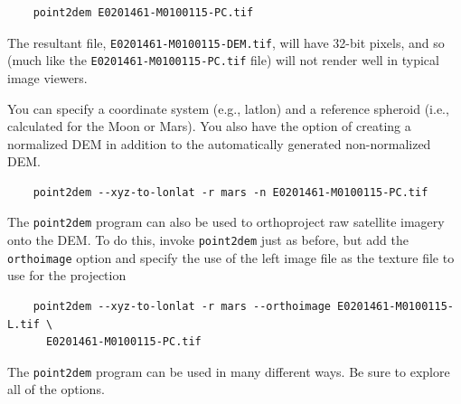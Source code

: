 \begin{verbatim}
    point2dem E0201461-M0100115-PC.tif
\end{verbatim}

The resultant file, \texttt{E0201461-M0100115-DEM.tif}, will have
32-bit pixels, and so (much like the \texttt{E0201461-M0100115-PC.tif}
file) will not render well in typical image viewers.

You can specify a coordinate system (e.g., latlon) and a reference
spheroid (i.e., calculated for the Moon or Mars). You also have the
option of creating a normalized DEM in addition to the automatically
generated non-normalized DEM.

\begin{verbatim}
    point2dem --xyz-to-lonlat -r mars -n E0201461-M0100115-PC.tif 
\end{verbatim}
\noindent
The \texttt{point2dem} program can also be used to orthoproject raw
satellite imagery onto the DEM. To do this, invoke \texttt{point2dem}
just as before, but add the \texttt{orthoimage} option and specify
the use of the left image file as the texture file to use for the
projection

\begin{verbatim}
    point2dem --xyz-to-lonlat -r mars --orthoimage E0201461-M0100115-L.tif \
      E0201461-M0100115-PC.tif
\end{verbatim}
\noindent
The \texttt{point2dem} program can be used in many different ways.
Be sure to explore all of the options.

